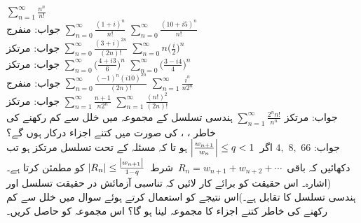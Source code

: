 \quad
$\sum\limits_{n=1}^{\infty} \tfrac{n^n}{n!}$\\
جواب:\quad
منفرج
\quad
$\sum\limits_{n=0}^{\infty}\tfrac{(1+i)^n}{n!}$
\quad
$\sum\limits_{n=0}^{\infty}\tfrac{(10+i5)^n}{n!}$\\
جواب:\quad
مرتکز
\quad
$\sum\limits_{n=0}^{\infty}\tfrac{(3+i)^{2n}}{(2n)!}$
\quad
$\sum\limits_{n=0}^{\infty}n\big(\tfrac{i}{2}\big)^n$\\
جواب:\quad
مرتکز
\quad
$\sum\limits_{n=0}^{\infty}\big(\tfrac{4+i3}{6}\big)^n$
\quad
$\sum\limits_{n=0}^{\infty}\big(\tfrac{3-i4}{4}\big)^n$\\
جواب:\quad
منفرج
\quad
$\sum\limits_{n=0}^{\infty}\tfrac{(-1)^n(i10)^{2n}}{(2n)!}$
\quad
$\sum\limits_{n=1}^{\infty}\tfrac{i^n}{n2^n}$\\
جواب:\quad
مرتکز
\quad
$\sum\limits_{n=1}^{\infty}\tfrac{n+1}{n2^n}$
\quad
$\sum\limits_{n=1}^{\infty}\tfrac{(n!)^2}{(2n)!}$\\
جواب:\quad
مرتکز
\quad
$\sum\limits_{n=1}^{\infty}\tfrac{2^n n!}{n^n}$
\quad
ہندسی تسلسل  کے مجموعہ   میں خلل  سے کم رکھنے کی خاطر ، ،  کی صورت میں کتنے اجزاء درکار ہوں گے؟\\
جواب:\quad
$4,\,\, 8,\,\, 66$
\quad
اگر 
$\,\abs{\tfrac{w_{n+1}}{w_n}}\le q<1\,$
ہو تا کہ مسئلہ  کے تحت تسلسل  مرتکز ہو تب دکھائیں کہ باقی
$\,R_n=w_{n+1}+w_{n+2}+\cdots\,$
شرط
$\,\abs{R_n}\le \tfrac{\abs{w_{n+1}}}{1-q}\,$
کو مطمئن کرتا ہے۔(اشارہ۔ اس حقیقت کو برائے کار لائیں کہ تناسبی آزمائش در حقیقت تسلسل  اور ہندسی تسلسل کا تقابل ہے۔)اس نتیجے کو استعمال کرتے  ہوئے  سوال  میں خلل  سے کم رکھنے کی خاطر کتنے اجزاء کا مجموعہ  لینا ہو گا؟  اس مجموعہ  کو حاصل کریں۔

